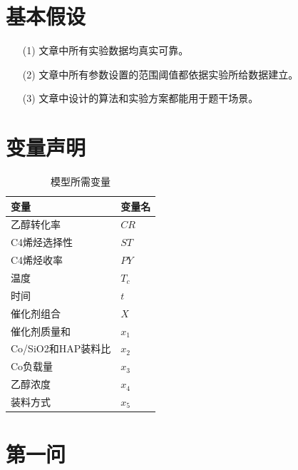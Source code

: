 \documentclass{article}
\begin{document}
	\section{基本假设}
	\begin{itemize}
		\item[(1)]文章中所有实验数据均真实可靠。
		\item[(2)]文章中所有参数设置的范围阈值都依据实验所给数据建立。
		\item[(3)]文章中设计的算法和实验方案都能用于题干场景。
	\end{itemize}

	\section{变量声明}
	\begin{table}[!h]
		\centering
		\caption{模型所需变量}
		\begin{tabular}{|l|l|}
			\hline
			变量 & 变量名 \\
			\hline
			乙醇转化率          & $CR$  \\
			C4烯烃选择性        & $ST$  \\
			C4烯烃收率         & $PY$  \\
			温度             & $T_c$  \\
			时间             & $t$   \\
			催化剂组合          & $X$   \\
			催化剂质量和         & $x_1$  \\
			Co/SiO2和HAP装料比 & $x_2$  \\
			Co负载量          & $x_3$  \\
			乙醇浓度           & $x_4$  \\
			装料方式           & $x_5$ \\
			\hline
		\end{tabular}
	\end{table}

	\section{第一问}
\end{document}
